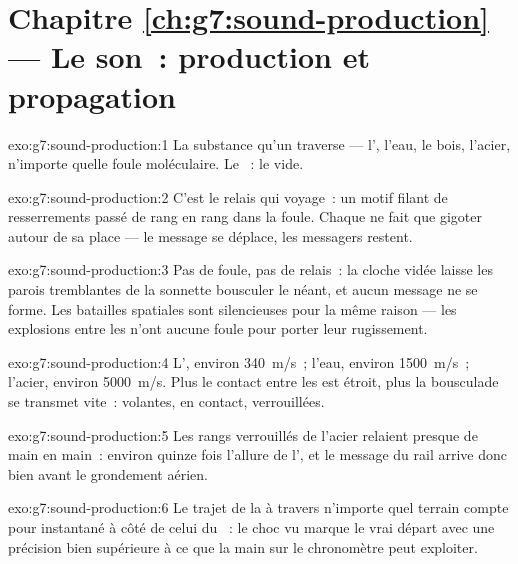 \section*{Chapitre \ref{ch:g7:sound-production} --- Le son~: production et propagation}

\begin{solution}{exo:g7:sound-production:1}
La substance qu'un  traverse --- l', l'eau, le bois, l'acier,
n'importe quelle foule moléculaire. Le ~: le vide.
\end{solution}

\begin{solution}{exo:g7:sound-production:2}
C'est le relais qui voyage~: un motif filant de resserrements passé
de rang en rang dans la foule. Chaque  ne fait que gigoter
autour de sa place --- le message se déplace, les messagers restent.
\end{solution}

\begin{solution}{exo:g7:sound-production:3}
Pas de foule, pas de relais~: la cloche vidée laisse les parois
tremblantes de la sonnette bousculer le néant, et aucun message ne se
forme. Les batailles spatiales sont silencieuses pour la même raison
--- les explosions entre les  n'ont aucune foule pour porter
leur rugissement.
\end{solution}

\begin{solution}{exo:g7:sound-production:4}
L', environ \qty{340}{m/s}~; l'eau, environ \qty{1500}{m/s}~;
l'acier, environ \qty{5000}{m/s}. Plus le contact entre les 
est étroit, plus la bousculade se transmet vite~: volantes, en
contact, verrouillées.
\end{solution}

\begin{solution}{exo:g7:sound-production:5}
Les rangs verrouillés de l'acier relaient presque de main en main~:
environ quinze fois l'allure de l', et le message du rail arrive
donc bien avant le grondement aérien.
\end{solution}

\begin{solution}{exo:g7:sound-production:6}
Le trajet de la  à travers n'importe quel terrain compte pour
instantané à côté de celui du ~: le choc vu marque le vrai départ
avec une précision bien supérieure à ce que la main sur le
chronomètre peut exploiter.
\end{solution}

